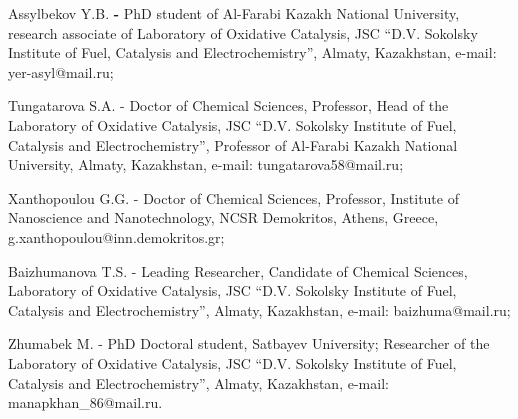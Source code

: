 \begin{noparindent}
Assylbekov Y.B. {\bfseries -} PhD student of Al-Farabi Kazakh National
University, research associate of Laboratory of Oxidative Catalysis, JSC
``D.V. Sokolsky Institute of Fuel, Catalysis and Electrochemistry'',
Almaty, Kazakhstan, e-mail: yer-asyl@mail.ru;

Tungatarova S.A. - Doctor of Chemical Sciences, Professor, Head of the
Laboratory of Oxidative Catalysis, JSC ``D.V. Sokolsky Institute of
Fuel, Catalysis and Electrochemistry'', Professor of Al-Farabi Kazakh
National University, Almaty, Kazakhstan, e-mail: tungatarova58@mail.ru;

Xanthopoulou G.G. - Doctor of Chemical Sciences, Professor, Institute of
Nanoscience and Nanotechnology, NCSR Demokritos, Athens, Greece,
g.xanthopoulou@inn.demokritos.gr;

Baizhumanova T.S. - Leading Researcher, Candidate of Chemical Sciences,
Laboratory of Oxidative Catalysis, JSC ``D.V. Sokolsky Institute of
Fuel, Catalysis and Electrochemistry'', Almaty, Kazakhstan, e-mail:
baizhuma@mail.ru;

Zhumabek M. - PhD Doctoral student, Satbayev University; Researcher of
the Laboratory of Oxidative Catalysis, JSC ``D.V. Sokolsky Institute of
Fuel, Catalysis and Electrochemistry'', Almaty, Kazakhstan, e-mail:
manapkhan\_86@mail.ru.
\end{noparindent}
